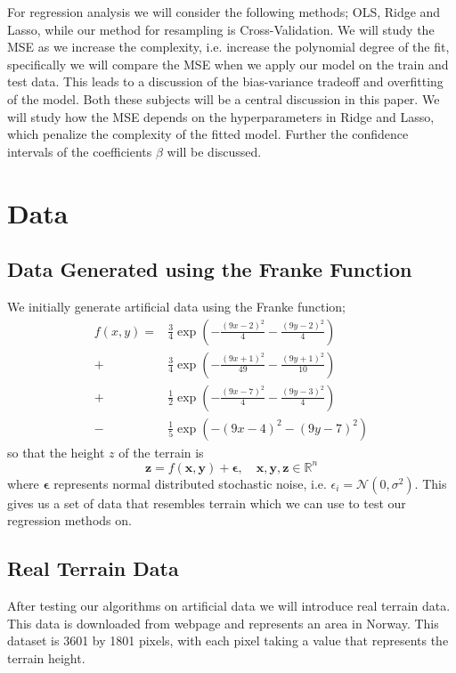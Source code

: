 \documentclass[%
 reprint,
nofootinbib,
 amsmath,amssymb,
 aps,
]{revtex4-2}
\begin{document}
For regression analysis we will consider the following methods; OLS, Ridge and Lasso, while our method for  resampling is Cross-Validation. We will study the MSE as we increase the complexity, i.e. increase the polynomial degree of the fit, specifically we will compare the MSE when we apply our model on the train and test data. This leads to a discussion of the bias-variance tradeoff and overfitting of the model. Both these subjects will be a central discussion in this paper. We will study how the MSE depends on the hyperparameters in Ridge and Lasso, which penalize the complexity of the fitted model. Further the confidence intervals of the coefficients $\beta$ will be discussed.



\section{Data}
\subsection{Data Generated using the Franke Function}
We initially generate artificial data using the Franke function;
%
\begin{align*}
f(x,y) = &\frac{3}{4} \exp\left( -\frac{(9x-2)^2}{4} -\frac{(9y - 2)^2}{4} \right) \\+&\frac{3}{4} \exp\left( -\frac{(9x+1)^2}{49} - \frac{(9y + 1)^2}{10} \right) \\+&\frac{1}{2} \exp\left( -\frac{(9x-7)^2}{4} - \frac{(9y - 3)^2}{4} \right)\\-&\frac{1}{5} \exp\left( -(9x-4)^2 - (9y - 7)^2 \right)
\end{align*}
%
so that the height $z$ of the terrain is
%
\begin{equation*}
\boldsymbol{z} = f(\boldsymbol{x},\boldsymbol{y}) + \boldsymbol{\epsilon}, \quad \boldsymbol{x}, \boldsymbol{y}, \boldsymbol{z} \in \mathbb{R}^{n}
\end{equation*}
%
where $\boldsymbol{\epsilon}$ represents normal distributed stochastic noise, i.e. $\epsilon_i = \mathcal{N}(0, \sigma^2)$. This gives us a set of data that resembles terrain which we can use to test our regression methods on.

\subsection{Real Terrain Data}
After testing our algorithms on artificial data we will introduce real terrain data. This data is downloaded from webpage \cite{terrain} and represents an area in Norway. This dataset is 3601 by 1801 pixels, with each pixel taking a value that represents the terrain height.
\end{document}
